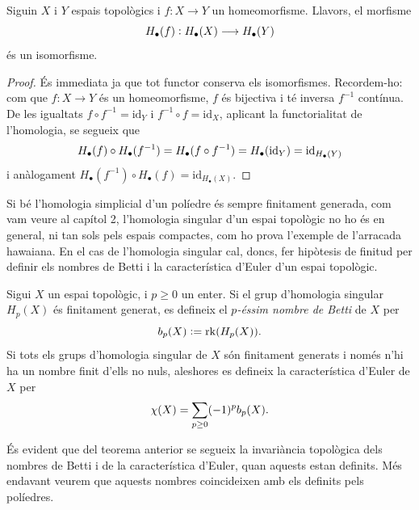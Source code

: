 \documentclass[../main.tex]{subfiles}
\begin{document}
\begin{ter}
\label{ter:invarianciatopologicahomologiasingular} Siguin $X$ i $Y$ espais topològics i $f:X\rightarrow Y$ un homeomorfisme. Llavors, el morfisme
\begin{equation}
    \notag
    H_\bullet(f):H_\bullet(X)\longrightarrow H_\bullet(Y)
\end{equation}
és un isomorfisme.
\end{ter}
\begin{proof}
És immediata ja que tot functor conserva els isomorfismes. Recordem-ho: com que $f:X\rightarrow Y$ és un homeomorfisme, $f$ és bijectiva i té inversa $f^{-1}$ contínua. De les igualtats $f\circ f^{-1} = \mathrm{id}_Y$ i $f^{-1}\circ f = \mathrm{id}_X$, aplicant la functorialitat de l'homologia, se segueix que
\begin{equation}
    \notag
    H_\bullet(f)\circ H_\bullet(f^{-1}) = H_\bullet(f\circ f^{-1}) = H_\bullet(\mathrm{id}_Y) = \mathrm{id}_{H_\bullet(Y)}
\end{equation}
i anàlogament $H_\bullet(f^{-1})\circ H_\bullet(f)=\mathrm{id}_{H_\bullet(X)}$.
\end{proof}

Si bé l'homologia simplicial d'un políedre és sempre finitament generada, com vam veure al capítol 2, l'homologia singular d'un espai topològic no ho és en general, ni tan sols pels espais compactes, com ho prova l'exemple de l'arracada hawaiana. En el cas de l'homologia singular cal, doncs, fer hipòtesis de finitud per definir els nombres de Betti i la característica d'Euler d'un espai topològic.

\begin{defi}
Sigui $X$ un espai topològic, i $p\geq 0$ un enter. Si el grup d'homologia singular $H_p(X)$ és finitament generat, es defineix el \textit{$p$-éssim nombre de Betti} de $X$ per
\begin{equation}
    \notag
    b_p(X):=\mathrm{rk}(H_p(X)).
\end{equation}
Si tots els grups d'homologia singular de $X$ són finitament generats i només n'hi ha un nombre finit d'ells no nuls, aleshores es defineix la característica d'Euler de $X$ per
\begin{equation}
    \notag
    \chi(X) = \sum_{p\geq 0}(-1)^pb_p(X).
\end{equation}
\end{defi}

És evident que del teorema anterior se segueix la invariància topològica dels nombres de Betti i de la característica d'Euler, quan aquests estan definits. Més endavant veurem que aquests nombres coincideixen amb els definits pels políedres.
\end{document}
